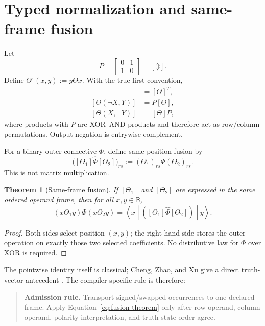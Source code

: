 \documentclass[10pt]{article}
\newcommand{\B}{\mathbb B}
\newcommand{\bxor}{\mathbin{\Updownarrow}}
\newcommand{\ptop}[1]{\widehat{#1}}
\theoremstyle{plain}
\newtheorem{theorem}{Theorem}
\theoremstyle{definition}
\theoremstyle{remark}
\begin{document}
\section{Typed normalization and same-frame fusion}
\label{sec:alignment}

Let
\begin{equation}
 P=\begin{bmatrix}0&1\\1&0\end{bmatrix}=[\bxor].
\end{equation}
Define $\Theta^\tau(x,y):=y\Theta x$. With the true-first convention,
\begin{align}
 [\Theta^\tau]&=[\Theta]^T, \\
 [\Theta(\neg X,Y)]&=P[\Theta], \\
 [\Theta(X,\neg Y)]&=[\Theta]P,
 \label{eq:input-transforms}
\end{align}
where products with $P$ are XOR--AND products and therefore act as row/column permutations. Output negation is entrywise complement.

For a binary outer connective $\Phi$, define same-position fusion by
\begin{equation}
 \bigl([\Theta_1]\ptop{\Phi}[\Theta_2]\bigr)_{rs}
 :=(\Theta_1)_{rs}\Phi(\Theta_2)_{rs}.
 \label{eq:pointwise}
\end{equation}
This is not matrix multiplication.

\begin{theorem}[Same-frame fusion]
If $[\Theta_1]$ and $[\Theta_2]$ are expressed in the same ordered operand frame, then for all $x,y\in\B$,
\begin{equation}
 (x\Theta_1 y)\Phi(x\Theta_2 y)
 =\left\langle x\middle|
 \left([\Theta_1]\ptop{\Phi}[\Theta_2]\right)
 \middle|y\right\rangle.
 \label{eq:fusion-theorem}
\end{equation}
\end{theorem}

\begin{proof}
Both sides select position $(x,y)$; the right-hand side stores the outer operation on exactly those two selected coefficients. No distributive law for $\Phi$ over XOR is required.
\end{proof}

The pointwise identity itself is classical; Cheng, Zhao, and Xu give a direct truth-vector antecedent \cite{Cheng2011}. The compiler-specific rule is therefore:

\begin{quote}
\textbf{Admission rule.} Transport signed/swapped occurrences to one declared frame. Apply Equation~\eqref{eq:fusion-theorem} only after row operand, column operand, polarity interpretation, and truth-state order agree.
\end{quote}
\end{document}
